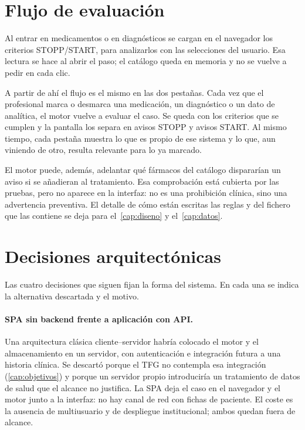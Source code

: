 \section{Flujo de evaluación}

Al entrar en medicamentos o en diagnósticos se cargan en el navegador
los criterios STOPP/START, para analizarlos con las selecciones del
usuario. Esa lectura se hace al abrir el paso; el catálogo queda en
memoria y no se vuelve a pedir en cada clic.

A partir de ahí el flujo es el mismo en las dos pestañas. Cada vez que
el profesional marca o desmarca una medicación, un diagnóstico o un
dato de analítica, el motor vuelve a evaluar el caso. Se queda con los
criterios que se cumplen y la pantalla los separa en avisos STOPP y
avisos START. Al mismo tiempo, cada pestaña muestra lo que es propio de
ese sistema y lo que, aun viniendo de otro, resulta relevante para lo
ya marcado.

El motor puede, además, adelantar qué fármacos del catálogo
dispararían un aviso si se añadieran al tratamiento. Esa comprobación
está cubierta por las pruebas, pero no aparece en la interfaz: no es
una prohibición clínica, sino una advertencia preventiva. El detalle de
cómo están escritas las reglas y del fichero que las contiene se deja
para el~\cref{cap:diseno} y el~\cref{cap:datos}.

\section{Decisiones arquitectónicas}

Las cuatro decisiones que siguen fijan la forma del sistema. En cada
una se indica la alternativa descartada y el motivo.

\paragraph{SPA sin backend frente a aplicación con API.}
Una arquitectura clásica cliente--servidor habría colocado el motor y
el almacenamiento en un servidor, con autenticación e integración
futura a una historia clínica. Se descartó porque el TFG no contempla
esa integración (\cref{cap:objetivos}) y porque un servidor propio
introduciría un tratamiento de datos de salud que el alcance no
justifica. La SPA deja el caso en el navegador y el motor junto a la
interfaz: no hay canal de red con fichas de paciente. El coste es la
ausencia de multiusuario y de despliegue institucional; ambos quedan
fuera de alcance.

